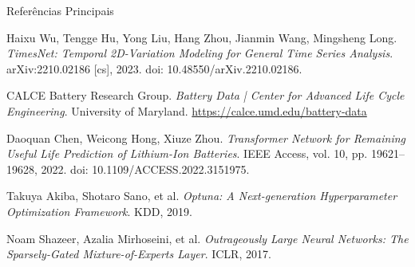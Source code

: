 \documentclass[aspectratio=169,xcolor=dvipsnames]{beamer}
\begin{document}
\begin{frame}{Referências Principais}
  \begin{thebibliography}{9}
    \small
      Haixu Wu, Tengge Hu, Yong Liu, Hang Zhou, Jianmin Wang, Mingsheng Long.
      \emph{TimesNet: Temporal 2D-Variation Modeling for General Time Series Analysis}.
      arXiv:2210.02186 [cs], 2023. doi: 10.48550/arXiv.2210.02186.
    
      CALCE Battery Research Group.
      \emph{Battery Data | Center for Advanced Life Cycle Engineering}.
      University of Maryland. \url{https://calce.umd.edu/battery-data}
      
      Daoquan Chen, Weicong Hong, Xiuze Zhou.
      \emph{Transformer Network for Remaining Useful Life Prediction of Lithium-Ion Batteries}.
      IEEE Access, vol. 10, pp. 19621--19628, 2022. doi: 10.1109/ACCESS.2022.3151975.
      
      Takuya Akiba, Shotaro Sano, et al.
      \emph{Optuna: A Next-generation Hyperparameter Optimization Framework}.
      KDD, 2019.
      
      Noam Shazeer, Azalia Mirhoseini, et al.
      \emph{Outrageously Large Neural Networks: The Sparsely-Gated Mixture-of-Experts Layer}.
      ICLR, 2017.
  \end{thebibliography}
\end{frame}
\end{document}
